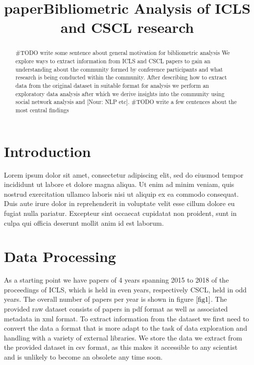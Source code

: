 \documentclass[journal,twocolumn]{IEEEtran}
\title{paper}
\begin{document}
    
    
    
\renewcommand{\figurename}{Figure}
\captionsetup{labelformat=simple}\title{Bibliometric Analysis of ICLS and CSCL research}
\author{\par
}
\maketitle

    
    

    

\begin{abstract}
    \#TODO write some sentence about general motivation for bibliometric
analysis We explore ways to extract information from ICLS and CSCL
papers to gain an understanding about the community formed by conference
participants and what research is being conducted within the community.
After describing how to extract data from the original dataset in
suitable format for analysis we perform an exploratory data analysis
after which we derive insights into the community using social network
analysis and {[}Nour: NLP etc{]}. \#TODO write a few centences about the
most central findings
\end{abstract}
    \hypertarget{introduction}{%
\section{Introduction}\label{introduction}}

Lorem ipsum dolor sit amet, consectetur adipiscing elit, sed do eiusmod
tempor incididunt ut labore et dolore magna aliqua. Ut enim ad minim
veniam, quis nostrud exercitation ullamco laboris nisi ut aliquip ex ea
commodo consequat. Duis aute irure dolor in reprehenderit in voluptate
velit esse cillum dolore eu fugiat nulla pariatur. Excepteur sint
occaecat cupidatat non proident, sunt in culpa qui officia deserunt
mollit anim id est laborum.

    \hypertarget{data-processing}{%
\section{Data Processing}\label{data-processing}}

    As a starting point we have papers of 4 years spanning 2015 to 2018 of
the proceedings of ICLS, which is held in even years, respectively CSCL,
held in odd years. The overall number of papers per year is shown in
figure \(\ref{fig1}\). The provided raw dataset consists of papers in
pdf format as well as associated metadata in xml format. To extract
information from the dataset we first need to convert the data a format
that is more adapt to the task of data exploration and handling with a
variety of external libraries. We store the data we extract from the
provided dataset in csv format, as this makes it accessible to any
scientist and is unlikely to become an obsolete any time soon.
\end{document}
